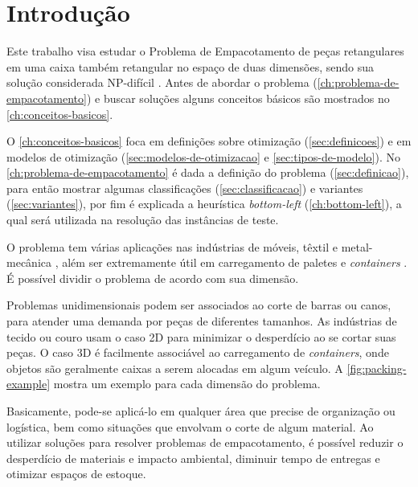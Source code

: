 \chapter*[Introdução]{Introdução}\label{ch:introducao}

Este trabalho visa estudar o Problema de Empacotamento de peças retangulares em uma caixa também retangular no espaço de duas dimensões, sendo sua solução considerada NP-difícil \cite{2DPackLib}.
Antes de abordar o problema (\autoref{ch:problema-de-empacotamento}) e buscar soluções alguns conceitos básicos são mostrados no \autoref{ch:conceitos-basicos}.

O \autoref{ch:conceitos-basicos} foca em definições sobre otimização (\autoref{sec:definicoes}) e em modelos de otimização (\autoref{sec:modelos-de-otimizacao} e \autoref{sec:tipos-de-modelo}).
No \autoref{ch:problema-de-empacotamento} é dada a definição do problema (\autoref{sec:definicao}), para então mostrar algumas classificações (\autoref{sec:classificacao}) e variantes (\autoref{sec:variantes}), por fim é explicada a heurística \textit{bottom-left} (\autoref{ch:bottom-left}), a qual será utilizada na resolução das instâncias de teste.

O problema tem várias aplicações nas indústrias de móveis, têxtil e metal-mecânica \cite{queiroz2022estudo, cavali2004problemas, belluzzo2005otimizacao}, além ser extremamente útil em carregamento de paletes e \textit{containers} \cite{morabito1992abordagem}.
É possível dividir o problema de acordo com sua dimensão.

Problemas unidimensionais podem ser associados ao corte de barras ou canos, para atender uma demanda por peças de diferentes tamanhos.
As indústrias de tecido ou couro usam o caso 2D para minimizar o desperdício ao se cortar suas peças.
O caso 3D é facilmente associável ao carregamento de \textit{containers}, onde objetos são geralmente caixas a serem alocadas em algum veículo.
A \autoref{fig:packing-example} mostra um exemplo para cada dimensão do problema.

Basicamente, pode-se aplicá-lo em qualquer área que precise de organização ou logística, bem como situações que envolvam o corte de algum material.
Ao utilizar soluções para resolver problemas de empacotamento, é possível reduzir o desperdício de materiais e impacto ambiental, diminuir tempo de entregas e otimizar espaços de estoque.





